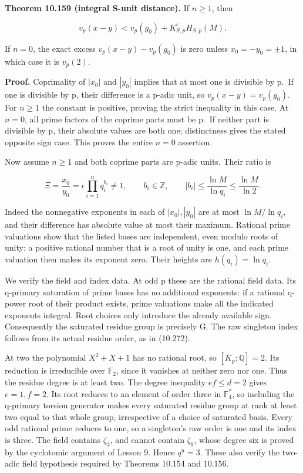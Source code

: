 \documentclass[
  11pt,
  a4paper,
]{article}
\begin{document}
\textbf{Theorem 10.159 (integral S-unit distance).} If \(n\ge1\), then

\[
v_p(x-y)<v_p(g_0)+K_{S,p}^{\epsilon}H_{S,p}(M).
\tag{10.513}
\]

If \(n=0\), the exact excess \(v_p(x-y)-v_p(g_0)\) is zero unless
\(x_0=-y_0=\pm1\), in which case it is \(v_p(2)\).

\textbf{Proof.} Coprimality of \(|x_0|\) and \(|y_0|\) implies that at
most one is divisible by p.~If one is divisible by p, their difference
is a p-adic unit, so \(v_p(x-y)=v_p(g_0)\). For \(n\ge1\) the constant
is positive, proving the strict inequality in this case. At \(n=0\), all
prime factors of the coprime parts must be p.~If neither part is
divisible by p, their absolute values are both one; distinctness gives
the stated opposite sign case. This proves the entire \(n=0\) assertion.

Now assume \(n\ge1\) and both coprime parts are p-adic units. Their
ratio is

\[
\Xi=\frac{x_0}{y_0}=\epsilon\prod_{i=1}^n q_i^{b_i}\ne1,
\qquad b_i\in\mathbb Z,\qquad
|b_i|\le\frac{\ln M}{\ln q_i}\le\frac{\ln M}{\ln2}.
\tag{10.514}
\]

Indeed the nonnegative exponents in each of \(|x_0|,|y_0|\) are at most
\(\ln M/\ln q_i\), and their difference has absolute value at most their
maximum. Rational prime valuations show that the listed bases are
independent, even modulo roots of unity: a positive rational number that
is a root of unity is one, and each prime valuation then makes its
exponent zero. Their heights are \(h(q_i)=\ln q_i\).

We verify the field and index data. At odd p these are the rational
field data. Its q-primary saturation of prime bases has no additional
exponents: if a rational q-power root of their product exists, prime
valuations make all the indicated exponents integral. Root choices only
introduce the already available sign. Consequently the saturated residue
group is precisely G. The raw singleton index follows from its actual
residue order, as in (10.272).

At two the polynomial \(X^2+X+1\) has no rational root, so
\([K_p:\mathbb Q]=2\). Its reduction is irreducible over
\(\mathbb F_2\), since it vanishes at neither zero nor one. Thus the
residue degree is at least two. The degree inequality \(ef\le d=2\)
gives \(e=1,f=2\). Its root reduces to an element of order three in
\(\mathbb F_4^*\), so including the q-primary torsion generator makes
every saturated residue group at rank at least two equal to that whole
group, irrespective of a choice of saturated basis. Every odd rational
prime reduces to one, so a singleton's raw order is one and its index is
three. The field contains \(\zeta_3\), and cannot contain \(\zeta_9\),
whose degree six is proved by the cyclotomic argument of Lesson 9. Hence
\(q^u=3\). These also verify the two-adic field hypothesis required by
Theorems 10.154 and 10.156.
\end{document}
